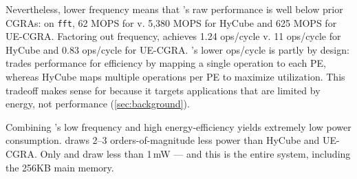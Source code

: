 Nevertheless, lower frequency means that \riptide's raw performance is well below prior CGRAs:
%
on {\tt fft}, 62 MOPS for \riptide v. 5,380 MOPS for HyCube
and 625 MOPS for UE-CGRA.
%
Factoring out frequency, \riptide achieves 1.24 ops/cycle
v. 11 ops/cycle for HyCube
and 0.83 ops/cycle for UE-CGRA.
%
\riptide's lower ops/cycle is partly by design:
\riptide trades performance for efficiency by mapping a single operation to each PE,
whereas HyCube maps multiple operations per PE to maximize utilization.
%
This tradeoff makes sense for \riptide
because it targets applications
that are limited by energy, not performance (\autoref{sec:background}).

Combining \riptide's low frequency and high energy-efficiency
yields extremely low power consumption.
%
\riptide draws 2--3 orders-of-magnitude less power
than HyCube and UE-CGRA.
%
Only \snafu and \riptide draw less than 1\,mW ---
and this is the entire system, including the 256KB main memory.
    
